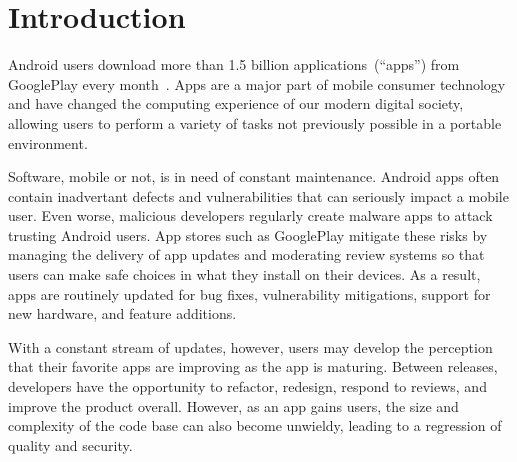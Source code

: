 \documentclass[conference]{IEEEtran}
\begin{document}




%
\IEEEpeerreviewmaketitle


\section{Introduction}




Android users download more than 1.5 billion applications~(``apps'') from GooglePlay every month~\cite{androidpopularity_url}. Apps are a major part of mobile consumer technology and have changed the computing experience of our modern digital society, allowing users to perform a variety of tasks not previously possible in a portable environment.

Software, mobile or not, is in need of constant maintenance. Android apps often contain inadvertant defects and vulnerabilities that can seriously impact a mobile user. Even worse, malicious developers regularly create malware apps to attack trusting Android users. App stores such as GooglePlay mitigate these risks by managing the delivery of app updates and moderating review systems so that users can make safe choices in what they install on their devices.  As a result, apps are routinely updated for bug fixes, vulnerability mitigations, support for new hardware, and feature additions.

With a constant stream of updates, however, users may develop the perception that their favorite apps are improving as the app is maturing. Between releases, developers have the opportunity to refactor, redesign, respond to reviews, and improve the product overall. However, as an app gains users, the size and complexity of the code base can also become unwieldy, leading to a regression of quality and security.
\end{document}
